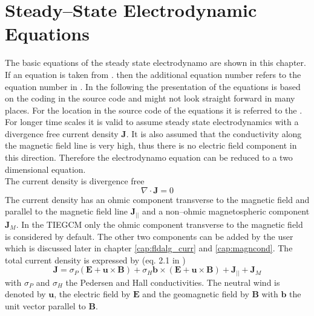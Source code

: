 %
\section{Steady--State Electrodynamic Equations}\label{cap:electro_equ}
%
The basic equations of the steady state electrodynamo
are shown in this chapter. If an equation is taken from \cite{rich95}. 
then the additional equation
number refers to the equation number in \cite{rich95}. 
In the following the presentation of the equations
is based on the coding in the source code and might not look
straight forward in many places. For the location in the source code 
of the equations it is referred to the
. \\

For longer time scales it is valid to assume steady state electrodynamics
with a divergence free current density $\mathbf{J}$. It is also assumed that
the conductivity along the magnetic field line is very high, thus there is no 
electric
field component in this direction. Therefore the electrodynamo equation 
can be reduced to a two dimensional equation. \\

The current density is divergence free
%
\begin{equation}
 \nabla \cdot  \mathbf{J} = 0
\end{equation}
%
The current density has an ohmic component 
transverse to the magnetic field and parallel to the magnetic field line
  $\mathbf{J}_{||}$ and a non--ohmic 
magnetospheric component $\mathbf{J}_{M}$. In the TIEGCM only the ohmic
component transverse to the magnetic field is considered by default.
The other two components can be added by the user which is
 discussed later in chapter \ref{cap:fldalg_curr} and \ref{cap:magncond}. 
The total current density is expressed by (eq. 2.1 in \cite{rich95})
%
\begin{equation}
  \mathbf{J} = \sigma_P (\mathbf{E} + \mathbf{u}\times \mathbf{B}) +
      \sigma_H \mathbf{b} \times (\mathbf{E} + \mathbf{u}\times \mathbf{B}) +
      \mathbf{J}_{||} + \mathbf{J}_{M}
\end{equation}
%
with $\sigma_P$ and $\sigma_H$ the Pedersen and Hall conductivities. The
neutral wind is denoted by $\mathbf{u}$, the electric field by $\mathbf{E}$
and the geomagnetic field by $\mathbf{B}$ with $\mathbf{b}$ the unit vector
parallel to $\mathbf{B}$. 

